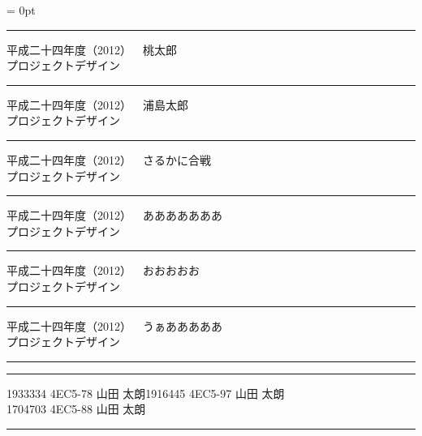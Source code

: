 \documentclass[a4paper,twocolumn,dvipdfmx,uplatex]{utarticle}
\begin{document}
\parindent = 0pt
 \bf 
\hrule\vspace{1mm}
平成二十四年度（2012）~~桃太郎\\   %
プロジェクトデザイン  \vspace{1mm}
\hrule
\par\vspace{1mm}
平成二十四年度（2012）~~浦島太郎\\   %
プロジェクトデザイン  \vspace{1mm}
\hrule
\par\vspace{1mm}
平成二十四年度（2012）~~さるかに合戦\\   %
プロジェクトデザイン  \vspace{1mm}
\hrule
\par\vspace{1mm}
平成二十四年度（2012）~~あああああああ\\   %
プロジェクトデザイン  \vspace{1mm}
\hrule
\par\vspace{1mm}
平成二十四年度（2012）~~おおおおお\\   %
プロジェクトデザイン  \vspace{1mm}
\hrule
\par\vspace{1mm}
平成二十四年度（2012）~~うぁあああああ\\   %
プロジェクトデザイン  \vspace{1mm}
\hrule
\par\vspace{1mm}
\newpage
\hrule
\vspace{1mm}
\hspace{1cm}1933334 4EC5-78 山田 太朗\hspace{1cm}1916445 4EC5-97 山田 太朗\\ %
\hspace{1cm}1704703 4EC5-88 山田 太朗\vspace{1mm}
\hrule\par\vspace{1mm}
\end{document}
